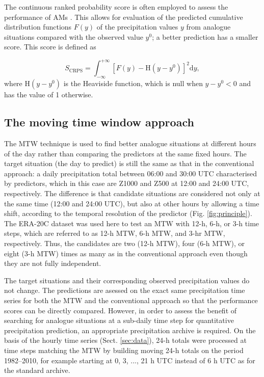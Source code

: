\documentclass[hess, manuscript]{copernicus}
\begin{document}
	The continuous ranked probability score \citep[CRPS,][]{Brown1974, Matheson1976, Hersbach2000} is often employed to assess the performance of AMs \citep[e.g.][]{Bontron2004, Bontron2005, BenDaoud2008, Horton2012, Marty2012, Radanovics2013, Chardon2014, Junk2015, BenDaoud2016, Caillouet2016}. This allows for evaluation of the predicted cumulative distribution functions $F(y)$ of the precipitation values $y$ from analogue situations compared with the observed value $y^{0}$; a better prediction has a smaller score. This score is defined as 
	
	\begin{equation}
	\label{eq:CRPS}
	S_{\text{CRPS}} = \int_{-\infty}^{+\infty} \left[ F(y)-\text{H}(y-y^{0})\right]^{2} \text{d}y ,  
	\end{equation}
	where $\text{H}(y-y^{0})$ is the Heaviside function, which is null when $y-y^{0}<0$ and has the value of 1 otherwise.
	
	
	\subsection{The moving time window approach}
	\label{sec:mtw}
	
	The MTW technique is used to find better analogue situations at different hours of the day rather than comparing the predictors at the same fixed hours. The target situation (the day to predict) is still the same as that in the conventional approach: a daily precipitation total between 06:00 and 30:00 UTC characterised by predictors, which in this case are Z1000 and Z500 at 12:00 and 24:00 UTC, respectively. The difference is that candidate situations are considered not only at the same time (12:00 and 24:00 UTC), but also at other hours by allowing a time shift, according to the temporal resolution of the predictor (Fig. \ref{fig:principle}). The ERA-20C dataset was used here to test an MTW with 12-h, 6-h, or 3-h time steps, which are referred to as 12-h MTW, 6-h MTW, and 3-hr MTW, respectively. Thus, the candidates are two (12-h MTW), four (6-h MTW), or eight (3-h MTW) times as many  as in the conventional approach even though they are not fully independent.
	
	The target situations and their corresponding observed precipitation values do not change. The predictions are asessed on the exact same precipitation time series for both the MTW and the conventional approach so that the performance scores can be directly compared. However, in order to assess the benefit of searching for analogue situations at a sub-daily time step for quantitative precipitation prediction, an appropriate precipitation archive is required. On the basis of the hourly time series (Sect. \ref{sec:data}), 24-h totals were processed at time steps matching the MTW by building moving 24-h totals on the period 1982--2010, for example starting at 0, 3, ..., 21 h UTC instead of 6 h UTC as for the standard archive.
	
\end{document}
